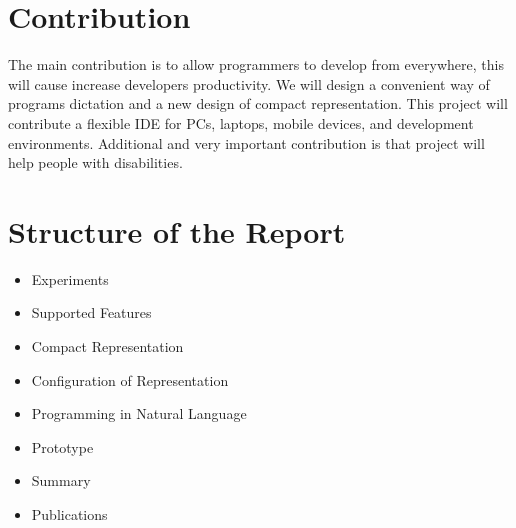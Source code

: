 \section{Contribution}
The main contribution is to allow programmers to develop from everywhere, this will cause increase developers productivity. We will design  a convenient way of programs dictation and a new design of compact representation. This project will contribute a flexible IDE for PCs, laptops, mobile devices, and development environments. Additional and very important contribution is that project will help people with disabilities.
\section{Structure of the Report}
\begin{itemize}
	\item Experiments
	\item Supported Features
	\item Compact Representation
	\item Configuration of Representation
	\item Programming in Natural Language
	\item Prototype
	\item Summary
	\item Publications
\end{itemize}